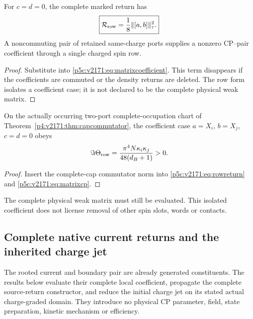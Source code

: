 \documentclass[12pt,a4paper]{article}
\begin{document}
\begin{corollary}
\label{p5c:v2171:cor:rowreturn}
For $c=d=0$, the complete marked return has
\begin{equation}
 \boxed{\mathcal R_{\rm row}=\frac18\|[a,b]\|_\tau^2.}
 \label{p5c:v2171:eq:rowreturn}
\end{equation}
A noncommuting pair of retained same-charge ports supplies a nonzero
CP--pair coefficient through a single charged spin row.
\end{corollary}
\begin{proof}
Substitute into \eqref{p5c:v2171:eq:matrixcoefficient}. This term disappears if
the coefficients are commuted or the density returns are deleted.
The row form isolates a coefficient case; it is not declared to be the
complete physical weak matrix.
\end{proof}


\begin{corollary}
\label{p5c:v2171:cor:cap-row-cp}
On the actually occurring two-port complete-occupation chart of
Theorem~\ref{p4:v2171:thm:capcommutator}, the coefficient case $a=X_i$, $b=X_j$,
$c=d=0$ obeys
\begin{equation}
 \Im\Theta_{\rm row}
 =\frac{\pi^4N\kappa_i\kappa_j}{48(d_B+1)}>0.
 \label{p5c:v2171:eq:caprowcp}
\end{equation}
\end{corollary}
\begin{proof}
Insert the complete-cap commutator norm into
\eqref{p5c:v2171:eq:rowreturn} and \eqref{p5c:v2171:eq:matrixcp}.
\end{proof}
The complete physical weak matrix must still be evaluated. This isolated
coefficient does not license removal of other spin slots, words or contacts.




\subsection{Complete native current returns and the inherited charge jet}
\label{p5c:sec:next187-complete-native-charge-jet}
The rooted current and boundary pair are already generated constituents.
The results below evaluate their complete local coefficient, propagate the
complete source-return constructor, and reduce the initial charge jet on its
stated actual charge-graded domain. They introduce no physical CP parameter,
field, state preparation, kinetic mechanism or efficiency.
\end{document}
